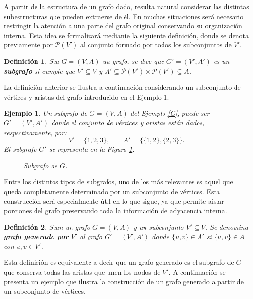 \documentclass[11pt,a4paper,spanish]{report}
\theoremstyle{plain}
\newtheorem{definicion}{Definición}[chapter]
\newtheorem{ejemplo}{Ejemplo}[chapter]
\begin{document}
A partir de la estructura de un grafo dado,
resulta natural considerar las distintas subestructuras que pueden extraerse
de él. En muchas situaciones será necesario restringir la atención a una
parte del grafo original conservando su organización interna. Esta idea se formalizará mediante la siguiente definición, donde se denota previamente por $\mathcal{P}(V')$ al conjunto formado por todos los subconjuntos de $V'$.


\begin{definicion}\cite{gross2018graph}
Sea $G=(V,A)$ un grafo, se dice que $G'=(V',A')$ es un \textbf{subgrafo} si cumple que   $V' \subseteq V$ y  $A' \subseteq \mathcal{P}(V') \times \mathcal{P}(V')\subseteq A$. 
\end{definicion}

La definición anterior se ilustra a continuación considerando un subconjunto
de vértices y aristas del grafo introducido en el Ejemplo \ref{e2.1}.

\begin{ejemplo}\label{e2.1}
 Un subgrafo de $G=(V,A)$ del Ejemplo \ref{G}, puede ser $G'=(V',A')$ donde el conjunto de vértices y aristas están dados, respectivamente, por:
\[
V' = \{1, 2, 3\}, \qquad
A' = \{\{1,2\}, \{2,3\}\}.
\]
 El subgrafo $G'$ se representa en la Figura \ref{fig:subgrafo G}.
  \begin{figure}[H]
\begin{center}
\end{center}
     \caption{{Subgrafo de $G$.}}
     \label{fig:subgrafo G}
 \end{figure}
\end{ejemplo}



Entre los distintos tipos de subgrafos, uno de los más relevantes es aquel que
queda completamente determinado por un subconjunto de vértices. Esta
construcción será especialmente útil en lo que sigue, ya que permite aislar
porciones del grafo preservando toda la información de adyacencia interna.
\begin{definicion}\cite{gross2018graph} 
    Sean un grafo $G=(V,A)$ y un subconjunto $V' \subseteq V$. Se denomina \textbf{grafo generado por $V'$} al grafo $G'=(V',A')$ donde $\{ u,v \} \in A'$ si $\{ u,v \} \in A$ con $u,v \in V'$. 
\end{definicion}
Esta definición es equivalente a decir que un grafo generado es el subgrafo de $G$ que conserva todas las aristas que unen los nodos de $V'$.
A continuación se presenta un ejemplo que ilustra la construcción de un grafo generado a partir de un subconjunto de vértices.
\end{document}
